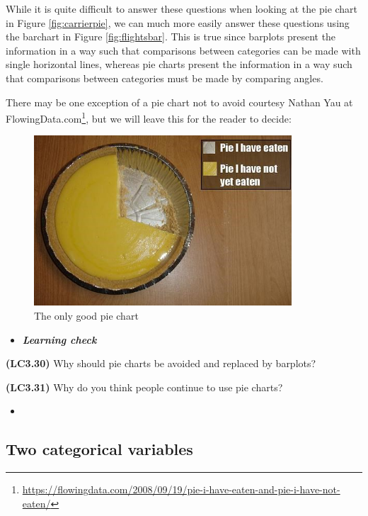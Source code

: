\documentclass[12pt, krantz2,]{krantz}
\renewcommand{\href}[2]{#2\footnote{\url{#1}}}
\newenvironment{rmdblock}[1]
  {\begin{shaded*}
  \begin{itemize}
  \renewcommand{\labelitemi}{
    \raisebox{-.7\height}[0pt][0pt]{
    }
  }
  \item
  }
  {
  \end{itemize}
  \end{shaded*}
  }
\newenvironment{learncheck}
  {\begin{rmdblock}{warning}}
  {\end{rmdblock}}
\begin{document}
While it is quite difficult to answer these questions when looking at the pie chart in Figure \ref{fig:carrierpie}, we can much more easily answer these questions using the barchart in Figure \ref{fig:flightsbar}. This is true since barplots present the information in a way such that comparisons between categories can be made with single horizontal lines, whereas pie charts present the information in a way such that comparisons between categories must be made by comparing angles.

There may be one exception of a pie chart not to avoid courtesy Nathan Yau at \href{https://flowingdata.com/2008/09/19/pie-i-have-eaten-and-pie-i-have-not-eaten/}{FlowingData.com}, but we will leave this for the reader to decide:

\begin{figure}

{\centering \includegraphics[width=\textwidth,height=2.5in]{images/Pie-I-have-Eaten} 

}

\caption{The only good pie chart}\label{fig:unnamed-chunk-36}
\end{figure}

\begin{learncheck}
\textbf{\emph{Learning check}}
\end{learncheck}

\textbf{(LC3.30)} Why should pie charts be avoided and replaced by barplots?

\textbf{(LC3.31)} Why do you think people continue to use pie charts?

\begin{learncheck}

\end{learncheck}

\hypertarget{two-categ-barplot}{%
\subsection{Two categorical variables}\label{two-categ-barplot}}
\end{document}

